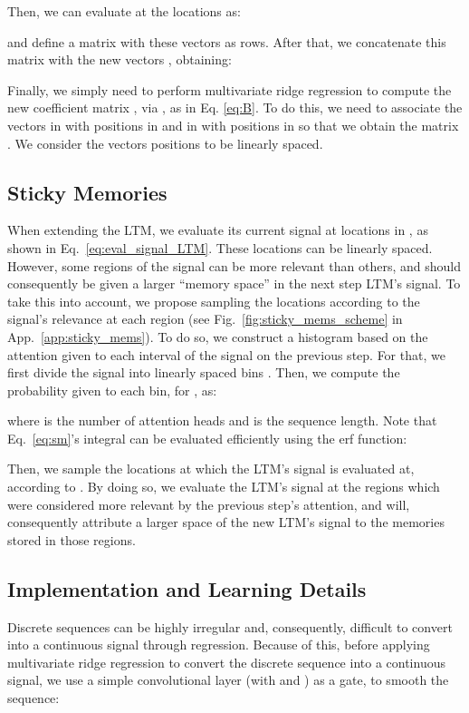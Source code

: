 \documentclass[11pt]{article}
\begin{document}
Then, we can evaluate  at the  locations  as:

and define a matrix   with these vectors as rows. 
After that, we concatenate this matrix with the new vectors , obtaining:


Finally, we simply need to 
perform multivariate ridge regression to compute the new coefficient matrix , via , as in Eq. \ref{eq:B}.
To do this, we need to associate the vectors in  with positions in  and in  with positions in  so that we obtain the matrix .
We consider the vectors positions to be linearly spaced.

\subsection{Sticky Memories}
\label{sec:sticky_mem}
When extending the LTM, we evaluate its current signal at  locations in , as shown in Eq.~\ref{eq:eval_signal_LTM}. These locations can be linearly spaced. However, some regions of the signal can be more relevant than others, and should consequently be given a larger ``memory space'' in the next step LTM's signal. 
To take this into account, we propose sampling the  locations according to the signal's relevance at each region (see Fig.~\ref{fig:sticky_mems_scheme} in App.~\ref{app:sticky_mems}). 
To do so, we construct a histogram based on the attention given to each interval of the signal on the previous step. For that, we first divide the signal into  linearly spaced bins . Then, we compute the probability given to each bin,  for , as:

where  is the number of attention heads and  is the sequence length. Note that Eq.~\ref{eq:sm}'s integral can be evaluated efficiently using the erf function:

Then, we sample the  locations at which the LTM's signal is evaluated at, according to . 
By doing so, we evaluate the LTM's signal at the regions which were considered more relevant by the previous step's attention, and will, consequently attribute a larger space of the new LTM's signal to the memories stored in those regions.

\subsection{Implementation and Learning Details}

Discrete sequences can be highly irregular and, consequently, difficult to convert into a continuous signal through regression. 
Because of this, before applying multivariate ridge regression to convert the discrete sequence  into a continuous signal,  we use a simple convolutional layer (with  and )  as a gate, to smooth the sequence:
\end{document}
